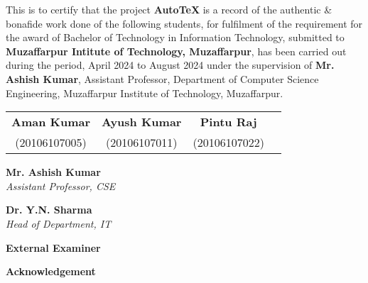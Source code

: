\documentclass[12pt, a4paper]{article}
\begin{document}
This is to certify that the project \textbf{AutoTeX} is a record of the authentic \& bonafide work done of the following students, for fulfilment of the requirement for the award of Bachelor of Technology in Information Technology, submitted to \textbf{Muzaffarpur Intitute of Technology, Muzaffarpur}, has been carried out during the period, April 2024 to August 2024 under the supervision of \textbf{Mr. Ashish Kumar}, Assistant Professor, Department of Computer Science Engineering, Muzaffarpur Institute of Technology, Muzaffarpur.

\vspace{1.5cm}
\begin{table}[H]
    \centering
    \setlength{\tabcolsep}{18pt}
    \renewcommand{\arraystretch}{1.2}
    \begin{tabular}{cccc}
        \textbf{Aman Kumar} & \textbf{Ayush Kumar} & \textbf{Pintu Raj} \\
        (20106107005) & (20106107011) & (20106107022)
    \end{tabular}
\end{table}

\begin{space}
\vspace{3cm}
\textbf{Mr. Ashish Kumar}\\
\textit{Assistant Professor, CSE}
\end{space}

\begin{space}
\vspace{3cm}
\textbf{Dr. Y.N. Sharma}\\
\textit{Head of Department, IT}
\end{space}

\begin{space}
\vspace{3cm}
\textbf{External Examiner}\par
\end{space}

\newpage

\newpage
\begin{center}
    \textbf{\Large Acknowledgement}
\end{center}
\end{document}
